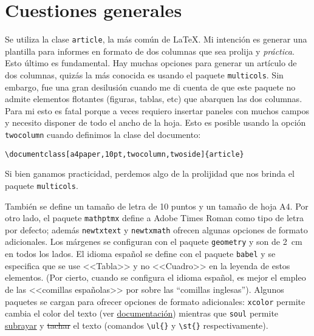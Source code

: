 \documentclass[a4paper,10pt,twocolumn,twoside]{article}
\begin{document}
\section{Cuestiones generales}
Se utiliza la clase \texttt{article}, la más común de \LaTeX. Mi intención es generar una plantilla para informes en formato de dos columnas que sea prolija y \emph{práctica}. Esto último es fundamental. Hay muchas opciones para generar un artículo de dos columnas, quizás la más conocida es usando el paquete \texttt{multicols}. Sin embargo, fue una gran desilusión cuando me di cuenta de que este paquete no admite elementos flotantes (figuras, tablas, etc) que abarquen las dos columnas. Para mi esto es fatal porque a veces requiero insertar paneles con muchos campos y necesito disponer de todo el ancho de la hoja. Esto es posible usando la opción \texttt{twocolumn} cuando definimos la clase del documento:
\begin{Verbatim}[fontsize=\fontsize{7pt}{7pt}\selectfont]
\documentclass[a4paper,10pt,twocolumn,twoside]{article}
\end{Verbatim}
Si bien ganamos practicidad, perdemos algo de la prolijidad que nos brinda el paquete \texttt{multicols}.

También se define un tamaño de letra de 10 puntos y un tamaño de hoja A4. Por otro lado, el paquete \texttt{mathptmx} define a Adobe Times Roman como tipo de letra por defecto; además \texttt{newtxtext} y \texttt{newtxmath} ofrecen algunas opciones de formato adicionales. Los márgenes se configuran con el paquete \texttt{geometry} y son de \SI{2}{\cm} en todos los lados. El idioma español se define con el paquete \texttt{babel} y se especifica que se use <<Tabla>> y no <<Cuadro>> en la leyenda de estos elementos. (Por cierto, cuando se configura el idioma español, es mejor el empleo de las <<comillas españolas>> por sobre las ``comillas inglesas''). Algunos paquetes se cargan para ofrecer opciones de formato adicionales: \texttt{xcolor} permite cambia el {\color{red}color} del texto (ver \href{https://ctan.dcc.uchile.cl/macros/latex/contrib/xcolor/xcolor.pdf}{documentación}) mientras que \texttt{soul} permite \ul{subrayar} y \st{tachar} el texto (comandos \verb+\ul{}+ y \verb+\st{}+ respectivamente).  
\end{document}
